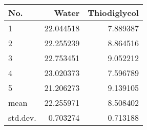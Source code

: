 \begin{tabular}{lrr}
\toprule
     No. &     Water &  Thiodiglycol \\
\midrule
       1 & 22.044518 &      7.889387 \\
       2 & 22.255239 &      8.864516 \\
       3 & 22.753451 &      9.052212 \\
       4 & 23.020373 &      7.596789 \\
       5 & 21.206273 &      9.139105 \\
    mean & 22.255971 &      8.508402 \\
std.dev. &  0.703274 &      0.713188 \\
\bottomrule
\end{tabular}